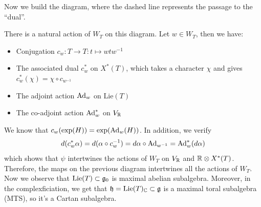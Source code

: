Now we build the diagram, where the dashed line represents the passage to the ``dual''.
 \begin{center}
\end{center}
There is a natural action of $W_T$ on this diagram. Let $w\in W_T$, then we have:
\begin{itemize}
    \item Conjugation $c_w:T\to T:t\mapsto wtw^{-1}$
    \item The associated dual $c_w^*$ on $X^*(T)$, which takes a character $\chi$ and gives 
    $c_w^*(\chi)=\chi\circ c_{w^{-1}}$
    \item The adjoint action $\text{Ad}_w$ on $\text{Lie}(T)$
    \item The co-adjoint action $\text{Ad}_w^*$ on $V_{\mathbb{R}}$
\end{itemize}

We know that $c_w(\exp(H))=\exp(\text{Ad}_w(H))$. In addition, we verify 
\begin{equation}
    d(c_w^*\alpha)=d(\alpha\circ c_w^{-1})=d\alpha\circ\text{Ad}_{w^{-1}}=\text{Ad}_w^*(d\alpha)
\end{equation}
which shows that $\psi$ intertwines the actions of $W_T$ on $V_{\mathbb{R}}$ and $\mathbb{R}\otimes X^*(T)$. Therefore, 
the maps on the previous diagram intertwines all the actions of $W_T$. Now we observe that 
$\text{Lie}(T)\subset \mathfrak{g}_0$ is maximal abelian subalgebra. Moreover, in the complexficiation, we get that 
$\mathfrak{h}=\text{Lie}(T)_{\mathbb{C}}\subset\mathfrak{g}$ is a maximal toral subalgebra (MTS), so it's a Cartan subalgebra.\par 

